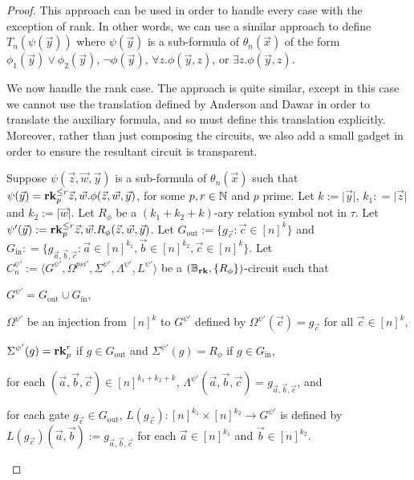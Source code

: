 \documentclass[../paper.tex]{subfiles}
\begin{document}
\begin{proof}
  This approach can be used in order to handle every case with the exception of
  rank. In other words, we can use a similar approach to define
  $T_n(\psi(\vec{y}))$ where $\psi(\vec{y})$ is a sub-formula of
  $\theta_n(\vec{x})$ of the form $\phi_1(\vec{y}) \lor \phi_2(\vec{y})$, $\neg
  \phi(\vec{y})$, $\forall z. \phi (\vec{y}, z)$, or $\exists z. \phi (\vec{y},
  z)$.

  We now handle the rank case. The approach is quite similar, except in this
  case we cannot use the translation defined by Anderson and Dawar in order to
  translate the auxiliary formula, and so must define this translation
  explicitly. Moreover, rather than just composing the circuits, we also add a
  small gadget in order to ensure the resultant circuit is transparent.
  
  Suppose $\psi(\vec{z}, \vec{w}, \vec{y})$ is a sub-formula of
  $\theta_n(\vec{x})$ such that $\psi (\vec{y}) = \text{\textbf{rk}}^{\leq r}_p \vec{z},
  \vec{w} .\phi(\vec{z}, \vec{w}, \vec{y})$, for some $p, r \in \mathbb{N}$ and $p$
  prime. Let $k:= \vert \vec{y} \vert$, $k_1 : = \vert \vec{z} \vert$ and $k_2
  := \vert \vec{w} \vert$. Let $R_\phi$ be a $(k_1 + k_2 + k)$-ary relation
  symbol not in $\tau$. Let $\psi'(\vec{y}) := \text{\textbf{rk}}^{\leq r}_p\vec{z}, \vec{w}.
  R_{\phi} (\vec{z}, \vec{w}, \vec{y})$. Let $G_{\text{out}} := \{g_{\vec{c}} :
  \vec{c} \in [n]^k\}$ and $G_{\text{in}} : = \{ g_{\vec{a}, \vec{b}, \vec{c}} :
  \vec{a} \in [n]^{k_1}, \vec{b} \in [n]^{k_2}, \vec{c} \in [n]^{k}\}$. Let
  $C^{\psi'}_n:= \langle G^{\psi'}, \Omega^{psi'}, \Sigma^{\psi'},
  \Lambda^{\psi'}, L^{\psi'}\rangle$ be a $(\mathbb{B}_{\text{\textbf{rk}}}, \{ R_{\phi}
  \})$-circuit such that
  \begin{itemizens}
  \item $G^{\psi'} = G_{\text{out}} \cup G_{\text{in}}$,
  \item $\Omega^{\psi'}$ be an injection from $[n]^k$ to $G^{\psi'}$ defined by
    $\Omega^{\psi'}(\vec{c}) = g_{\vec{c}}$ for all $\vec{c} \in [n]^k$,
  \item $\Sigma^{\psi'} (g) = \text{\textbf{rk}}^r_p$ if $g \in G_{\text{out}}$ and
    $\Sigma^{\psi'}(g) = R_\phi$ if $g \in G_{\text{in}}$,
  \item for each $(\vec{a}, \vec{b}, \vec{c}) \in [n]^{k_1 +k_2 + k}$,
    $\Lambda^{\psi'} (\vec{a}, \vec{b}, \vec{c}) = g_{\vec{a}, \vec{b},
      \vec{c}}$, and
  \item for each gate $g_{\vec{c}} \in G_{\text{out}}$, $L(g_{\vec{c}}):
    [n]^{k_1} \times [n]^{k_2} \rightarrow G^{\psi'}$ is defined by
    $L(g_{\vec{c}})(\vec{a}, \vec{b}) := g_{\vec{a}, \vec{b}, \vec{c}}$ for each
    $\vec{a} \in [n]^{k_1}$ and $\vec{b} \in [n]^{k_2}$.
  \end{itemizens}


\end{proof}
\end{document}
